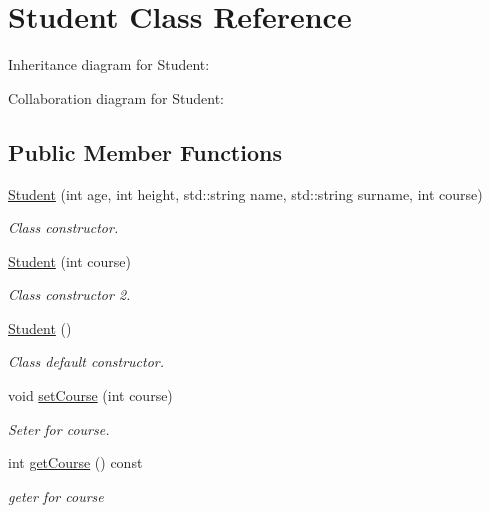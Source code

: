 \hypertarget{classStudent}{}\section{Student Class Reference}
\label{classStudent}


Inheritance diagram for Student\+:


Collaboration diagram for Student\+:
\subsection*{Public Member Functions}
\begin{DoxyCompactItemize}
\item 
\hyperlink{classStudent_aa849d9b60484adb7bd3ec7e137ab8d03}{Student} (int age, int height, std\+::string name, std\+::string surname, int course)
\begin{DoxyCompactList}\small\item\em Class constructor. \end{DoxyCompactList}\item 
\hyperlink{classStudent_ac8c023bf9bcc7de27614d1b8f7511e4f}{Student} (int course)
\begin{DoxyCompactList}\small\item\em Class constructor 2. \end{DoxyCompactList}\item 
\mbox{\label{classStudent_af9168cedbfa5565cf0b20c1a9d3f5c9d}} 
\hyperlink{classStudent_af9168cedbfa5565cf0b20c1a9d3f5c9d}{Student} ()
\begin{DoxyCompactList}\small\item\em Class default constructor. \end{DoxyCompactList}\item 
void \hyperlink{classStudent_af7affdfd5b1b9e4d8c8d1fcb1e2cc631}{set\+Course} (int course)
\begin{DoxyCompactList}\small\item\em Seter for course. \end{DoxyCompactList}\item 
\mbox{\label{classStudent_a7ca1414a43b0c0194defe9a7929567a2}} 
int \hyperlink{classStudent_a7ca1414a43b0c0194defe9a7929567a2}{get\+Course} () const
\begin{DoxyCompactList}\small\item\em geter for course \end{DoxyCompactList}\item 

\end{DoxyCompactItemize}
